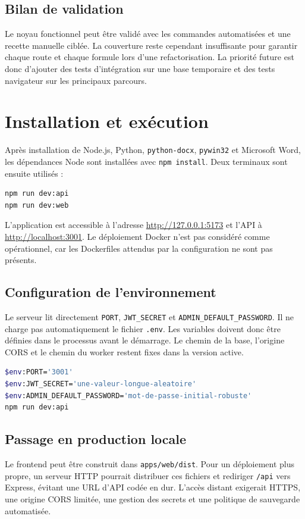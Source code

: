 \documentclass[12pt,a4paper,oneside]{report}
\newcommand{\code}[1]{\texttt{#1}}
\begin{document}
\subsection{Bilan de validation}
Le noyau fonctionnel peut être validé avec les commandes automatisées et une recette manuelle ciblée. La couverture reste cependant insuffisante pour garantir chaque route et chaque formule lors d'une refactorisation. La priorité future est donc d'ajouter des tests d'intégration sur une base temporaire et des tests navigateur sur les principaux parcours.

\section{Installation et exécution}
Après installation de Node.js, Python, \code{python-docx}, \code{pywin32} et Microsoft Word, les dépendances Node sont installées avec \code{npm install}. Deux terminaux sont ensuite utilisés :
\begin{lstlisting}[language=bash,caption={Démarrage local}]
npm run dev:api
npm run dev:web
\end{lstlisting}
L'application est accessible à l'adresse \url{http://127.0.0.1:5173} et l'API à \url{http://localhost:3001}. Le déploiement Docker n'est pas considéré comme opérationnel, car les Dockerfiles attendus par la configuration ne sont pas présents.

\subsection{Configuration de l'environnement}
Le serveur lit directement \code{PORT}, \code{JWT\_SECRET} et \code{ADMIN\_DEFAULT\_PASSWORD}. Il ne charge pas automatiquement le fichier \code{.env}. Les variables doivent donc être définies dans le processus avant le démarrage. Le chemin de la base, l'origine CORS et le chemin du worker restent fixes dans la version active.

\begin{lstlisting}[language=bash,caption={Exemple de configuration PowerShell}]
$env:PORT='3001'
$env:JWT_SECRET='une-valeur-longue-aleatoire'
$env:ADMIN_DEFAULT_PASSWORD='mot-de-passe-initial-robuste'
npm run dev:api
\end{lstlisting}

\subsection{Passage en production locale}
Le frontend peut être construit dans \code{apps/web/dist}. Pour un déploiement plus propre, un serveur HTTP pourrait distribuer ces fichiers et rediriger \code{/api} vers Express, évitant une URL d'API codée en dur. L'accès distant exigerait HTTPS, une origine CORS limitée, une gestion des secrets et une politique de sauvegarde automatisée.
\end{document}
